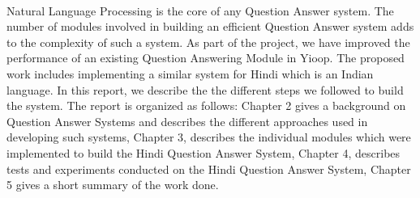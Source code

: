 \paragraph{}
Natural Language Processing is the core of any Question Answer system. The number of modules involved in building an efficient Question Answer system adds to the complexity of such a system. As part of the project, we have improved the performance of an existing Question Answering Module \cite {patel2015question} in Yioop. The proposed work includes implementing a similar system for Hindi which is an Indian language. In this report, we describe the the different steps we followed to build the system. The report is organized as follows: Chapter 2 gives a background on Question Answer Systems and describes the different approaches used in developing such systems, Chapter 3, describes the individual modules which were implemented to build the Hindi Question Answer System, Chapter 4, describes tests and experiments conducted on the Hindi Question Answer System, Chapter 5 gives a short summary of the work done.

